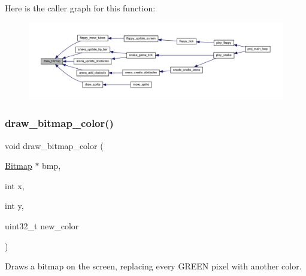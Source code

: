 Here is the caller graph for this function\+:\nopagebreak
\begin{figure}[H]
\begin{center}
\leavevmode
\includegraphics[width=350pt]{group__bitmap_ga37e42f0583efd18e7efa5a036798539e_icgraph}
\end{center}
\end{figure}
\mbox{\label{group__bitmap_ga0a2714359072f1a1b3f361c89e30be52}} 
\subsubsection{\texorpdfstring{draw\+\_\+bitmap\+\_\+color()}{draw\_bitmap\_color()}}
{\footnotesize\ttfamily void draw\+\_\+bitmap\+\_\+color (\begin{DoxyParamCaption}\item[{\mbox{\hyperlink{struct_bitmap}{Bitmap}} $\ast$}]{bmp,  }\item[{int}]{x,  }\item[{int}]{y,  }\item[{uint32\+\_\+t}]{new\+\_\+color }\end{DoxyParamCaption})}



Draws a bitmap on the screen, replacing every G\+R\+E\+EN pixel with another color. 


